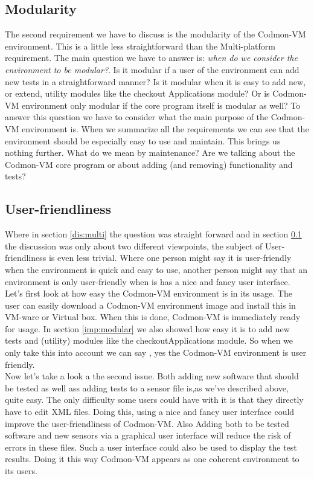 \documentclass{article}
\newcommand{\project}{Codmon-VM}
\begin{document}
\subsection{Modularity}
\label{dis:modular}
The second requirement we have to discuss is the modularity of the \project{} environment. This is a little less straightforward than the Multi-platform requirement. The main question we have to answer is: 
\emph{when do we consider the environment to be modular?}. Is it modular if a user of the environment can add new tests in a straightforward manner? Is it modular when it is easy to add new, or extend, utility 
modules like the checkout Applications module? Or is \project{} environment only modular if the core program itself is modular as well? To answer this question we have to consider what the main purpose of the 
\project{} environment is. When we summarize all the requirements we can see that the environment should be especially easy to use and maintain. This brings us nothing further. What do we mean by 
maintenance? Are we talking about the \project{} core program or about adding (and removing) functionality and tests? 

\subsection{User-friendliness}
\label{dis:user}
Where in section \ref{dis:multi} the question was straight forward and in section \ref{dis:modular} the discussion was only about two different viewpoints, the subject of User-friendliness is even less trivial. 
Where one person might say it is user-friendly when the environment is quick and easy to use, another person might say that an environment is only user-friendly when is has a nice and fancy user interface.\\

\noindent Let's first look at how easy the \project{} environment is in its usage. The user can easily download a \project{} environment image and install this in VM-ware or Virtual box. When this is done, 
\project{} is immediately ready for usage. In section \ref{imp:modular} we also showed how easy it is to add new tests and (utility) modules like the checkoutApplications module. So when we only take this into 
account we can say , yes the \project{} environment is user friendly.\\

\noindent Now let's take a look a the second issue. Both adding new software that should be tested as well ass adding tests to a sensor file is,as we've described above, quite easy. The only difficulty some users 
could have with it is that they directly have to edit XML files. Doing this, using a nice and fancy user interface could improve the user-friendliness of \project{}. Also Adding both to be tested software and new 
sensors via a graphical user interface will reduce the risk of errors in these files. Such a user interface could also be used to display the test results. Doing it this way \project{} appears as one coherent 
environment to its users.\\
\end{document}
